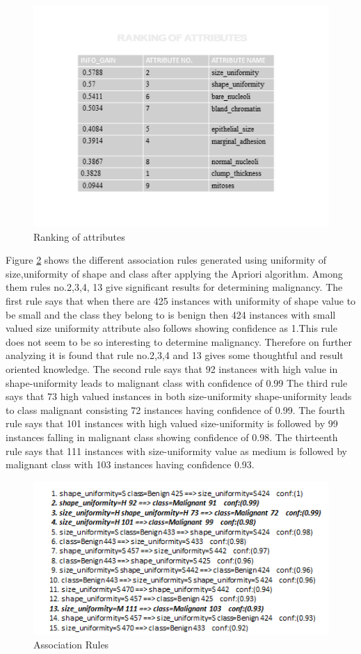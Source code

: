 \documentclass[conference]{IEEEtran}
\begin{document}
\begin{figure}[!h]
\centering
\includegraphics[scale=0.7]{RANKING}
\caption{Ranking of attributes}
\label{fig_rank}
\end{figure}
Figure \ref{fig_asorules}  shows the different association rules generated using  uniformity of size,uniformity of shape  and class after applying the Apriori algorithm. Among them rules no.2,3,4, 13 give significant results for determining malignancy.
The first rule says that when there are 425 instances with uniformity of shape value to be small and the class they belong to is benign then 424 instances with small valued size uniformity attribute also follows showing confidence as 1.This rule does not seem to be so interesting to determine malignancy. Therefore on further analyzing it is  found that rule no.2,3,4 and 13 gives some thoughtful and result oriented knowledge.
The second rule says that 92 instances with  high value in shape-uniformity leads to malignant class with confidence of 0.99
The third rule says that 73 high valued instances in both size-uniformity shape-uniformity leads to class malignant consisting 72 instances having confidence of 0.99.
The fourth rule says that 101 instances with high valued size-uniformity is followed by 99 instances falling in malignant class showing confidence of 0.98.
The thirteenth rule says that 111 instances with size-uniformity value as medium is followed by malignant class with 103 instances having confidence 0.93.

\begin{figure}[!h]
\centering
\includegraphics[scale=0.7]{asorules}
\caption{Association Rules}
\label{fig_asorules}
\end{figure}
\end{document}
